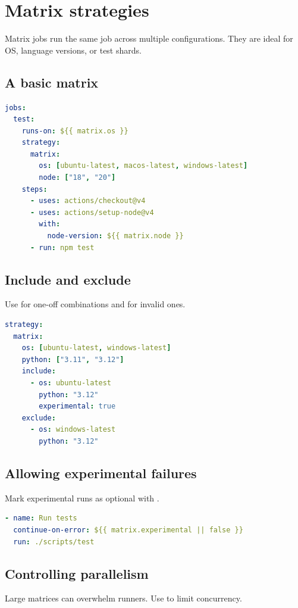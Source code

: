 \chapter{Matrix strategies}

Matrix jobs run the same job across multiple configurations.
They are ideal for OS, language versions, or test shards.

\section{A basic matrix}
\begin{lstlisting}[language=YAML]
jobs:
  test:
    runs-on: ${{ matrix.os }}
    strategy:
      matrix:
        os: [ubuntu-latest, macos-latest, windows-latest]
        node: ["18", "20"]
    steps:
      - uses: actions/checkout@v4
      - uses: actions/setup-node@v4
        with:
          node-version: ${{ matrix.node }}
      - run: npm test
\end{lstlisting}

\section{Include and exclude}
Use  for one-off combinations and  for invalid ones.

\begin{lstlisting}[language=YAML]
strategy:
  matrix:
    os: [ubuntu-latest, windows-latest]
    python: ["3.11", "3.12"]
    include:
      - os: ubuntu-latest
        python: "3.12"
        experimental: true
    exclude:
      - os: windows-latest
        python: "3.12"
\end{lstlisting}

\section{Allowing experimental failures}
Mark experimental runs as optional with .

\begin{lstlisting}[language=YAML]
- name: Run tests
  continue-on-error: ${{ matrix.experimental || false }}
  run: ./scripts/test
\end{lstlisting}

\section{Controlling parallelism}
Large matrices can overwhelm runners.
Use  to limit concurrency.

